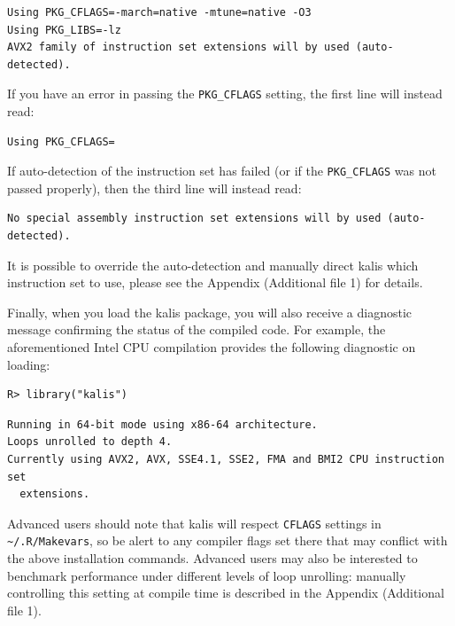 \documentclass[a4paper]{article}
\newcommand{\pkg}[1]{{\fontseries{m}\fontseries{b}\selectfont #1}}
\begin{document}
\begin{verbatim}
Using PKG_CFLAGS=-march=native -mtune=native -O3
Using PKG_LIBS=-lz
AVX2 family of instruction set extensions will by used (auto-detected).
\end{verbatim}

If you have an error in passing the \texttt{PKG\_CFLAGS} setting, the first line will instead read:

\begin{verbatim}
Using PKG_CFLAGS=
\end{verbatim}

If auto-detection of the instruction set has failed (or if the \texttt{PKG\_CFLAGS} was not passed properly), then the third line will instead read:

\begin{verbatim}
No special assembly instruction set extensions will by used (auto-detected).
\end{verbatim}

It is possible to override the auto-detection and manually direct \pkg{kalis} which instruction set to use, please see the Appendix (Additional file 1) for details.

Finally, when you load the \pkg{kalis} package, you will also receive a diagnostic message confirming the status of the compiled code.
For example, the aforementioned Intel CPU compilation provides the following diagnostic on loading:

\begin{verbatim}
R> library("kalis")
\end{verbatim}

\begin{verbatim}
Running in 64-bit mode using x86-64 architecture.
Loops unrolled to depth 4.
Currently using AVX2, AVX, SSE4.1, SSE2, FMA and BMI2 CPU instruction set
  extensions.
\end{verbatim}

Advanced users should note that \pkg{kalis} will respect \texttt{CFLAGS} settings in \texttt{\textasciitilde{}/.R/Makevars}, so be alert to any compiler flags set there that may conflict with the above installation commands.
Advanced users may also be interested to benchmark performance under different levels of loop unrolling: manually controlling this setting at compile time is described in the Appendix (Additional file 1).
\end{document}
